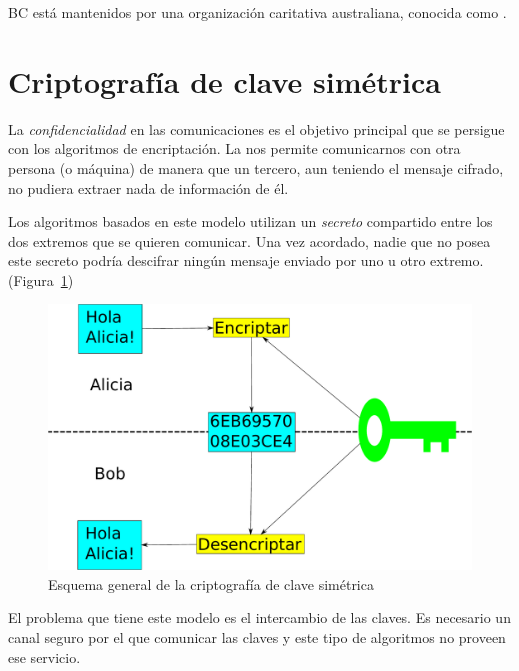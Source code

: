 BC está mantenidos por una organización caritativa australiana, conocida como . \emph{\parencite{Reference4}}


\section{Criptografía de clave simétrica}

La \emph{confidencialidad} en las comunicaciones es el objetivo principal que se persigue con los algoritmos de encriptación.
La  nos permite comunicarnos con otra persona (o máquina) de manera que un tercero,
aun teniendo el mensaje cifrado, no pudiera extraer nada de información de él.

Los algoritmos basados en este modelo utilizan un \emph{secreto} compartido entre los dos extremos que se quieren comunicar.
Una vez acordado, nadie que no posea este secreto podría descifrar ningún mensaje enviado por uno u otro extremo.
(Figura~\ref{fig:SymmetricKeyEncryption})

\begin{figure}[ht]
  \centering
  \includegraphics[scale=0.4]{Figures/SymmetricKeyEncryption}
  \decoRule
  \caption[Criptografía de clave simétrica (Esquema)]{Esquema general de la criptografía de clave simétrica}
  \label{fig:SymmetricKeyEncryption}
\end{figure}

El problema que tiene este modelo es el intercambio de las claves.
Es necesario un canal seguro por el que comunicar las claves y este tipo de algoritmos no proveen ese servicio. \emph{\parencite{Reference19}}

